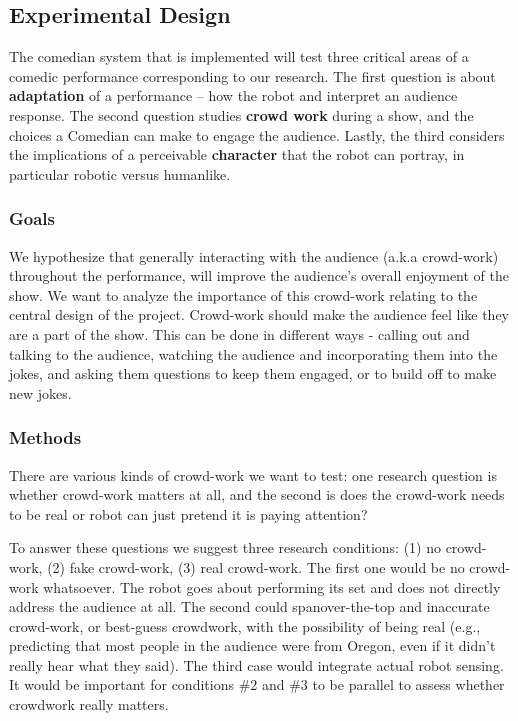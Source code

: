﻿\documentclass[onecolumn, draftclsnofoot,10pt, compsoc]{IEEEtran}
\begin{document}
\subsection{Experimental Design}

The comedian system that is implemented will test three critical areas of a comedic performance corresponding to our research. The first question is about \textbf{adaptation} of a performance -- how the robot and interpret an audience response. The second question studies \textbf{crowd work} during a show, and the choices a Comedian can make to engage the audience. Lastly, the third considers the implications of a perceivable \textbf{character} that the robot can portray, in particular robotic versus humanlike.

\subsubsection{Goals}

We hypothesize that generally interacting with the audience (a.k.a crowd-work) throughout the performance, will improve the audience's overall enjoyment of the show. We want to analyze the importance of this crowd-work relating to the central design of the project.
Crowd-work should make the audience feel like they are a part of the show. This can be done in different ways - calling out and talking to the audience, watching the audience and incorporating them into the jokes, and asking them questions to keep them engaged, or to build off to make new jokes.

\subsubsection{Methods}
There are various kinds of crowd-work we want to test: one research question is whether crowd-work matters at all, and the second is does the crowd-work needs to be real or robot can just pretend it is paying attention?

To answer these questions we suggest three research conditions: (1) no crowd-work, (2) fake crowd-work, (3) real crowd-work. The first one would be no crowd-work whatsoever. The robot goes about performing its set and does not directly address the audience at all. The second could spanover-the-top and inaccurate crowd-work, or best-guess crowdwork, with the possibility of being real (e.g., predicting that most people in the audience were from Oregon, even if it didn't really hear what they said). The third case would integrate actual robot sensing. It would be important for conditions \#2 and \#3 to be parallel to assess whether crowdwork really matters.
\end{document}
